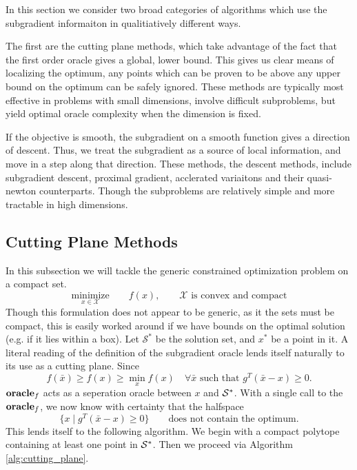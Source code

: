 In this section we consider two broad categories of algorithms which use the
subgradient informaiton in qualitiatively different ways. 

The first are the cutting plane methods, which take advantage of the fact that
the first order oracle gives a global, lower bound. This gives us clear means
of localizing the optimum, any points which can be proven to be above any
upper bound on the optimum can be safely ignored.  These methods are typically
most effective in problems with small dimensions, involve difficult subproblems,
but yield optimal oracle complexity when the dimension is fixed.

If the objective is smooth, the subgradient on a smooth function gives a
direction of descent. Thus, we treat the subgradient as a source of local
information, and move in a step along that direction. These methods, the descent
methods, include subgradient descent, proximal gradient, acclerated variaitons
and their quasi-newton counterparts. Though the subproblems are relatively simple 
and more tractable in high dimensions.

\subsection{Cutting Plane Methods} In this subsection we will tackle the 
generic constrained optimization problem on a compact set.
$$
\underset{x \in \mathcal{X}}{\mbox{minimize}}\qquad f(x), \qquad \mathcal{X} \mbox{ is convex and compact}
$$
Though this formulation does not appear to be generic, as it the sets must be compact,
this is easily worked around if we have bounds on the optimal solution
(e.g. if it lies within a box). Let $\mathcal{S}^*$ be the solution set, and $x^*$ be a point in it. A literal reading of the definition of the subgradient oracle lends itself naturally to its use as a cutting plane. Since
\[
f(\bar{x}) \geq f(x) \geq \min_x f(x)
	\quad\forall \mbox{$\bar{x}$ such that ${g^T}{(\bar{x}-x)}\geq 0$}.
\]
$\mbox{\bf oracle}_f$ acts as a seperation oracle between $x$ and $\mathcal{S^*}$.
With a single call to the $\mbox{\bf oracle}_f$, we now know with 
certainty that the halfspace
$$\{ x \mid {g^T}{(\bar{x}-x)}\geq 0 \} \qquad \mbox{does not contain
the optimum.}$$ 
This lends itself to the following algorithm. We begin with a compact
polytope containing at least one point in $\mathcal{S^*}$. Then we proceed via
Algorithm \ref{alg:cutting_plane}. 


